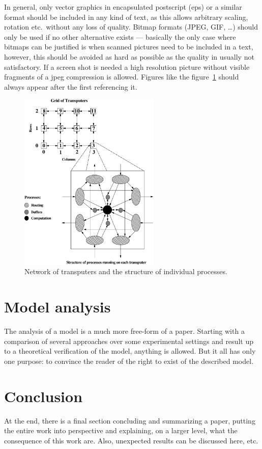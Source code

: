 \documentclass[12pt,twoside]{article}
\theoremstyle{plain}
\theoremstyle{definition}
\theoremstyle{remark}
\begin{document}
In general, only vector graphics in encapsulated postscript (eps) or a similar format should be included in any kind of text, as this allows arbitrary scaling, rotation etc.\ without any loss of quality. Bitmap formats (JPEG, GIF, \dots) should only be used if no other alternative exists
--- basically the only case where bitmaps can be justified is when scanned pictures need to be included in a text, however, this should be avoided as hard as possible as the quality in usually not satisfactory. If a screen shot is needed a high resolution picture without visible fragments of a jpeg compression is allowed. Figures like the figure~\ref{fig:samplefig} should always appear after the first referencing it.
\begin{figure}[hbtp]
	 \centerline{\includegraphics[width=0.6\textwidth]{samplefig.pdf}}
	 {\caption{Network of transputers and the structure of individual
processes.}\label{fig:samplefig}}
\end{figure}

\section{Model analysis}
\label{sec:analysis}
The analysis of a model is a much more free-form of a paper. Starting with a comparison of several approaches over some experimental settings and result up to a theoretical verification of the model, anything is allowed. But it all has only one purpose: to convince the reader of the right to exist of the described model.

\section{Conclusion}
\label{sec:concl}

At the end, there is a final section concluding and summarizing a
paper, putting the entire work into perspective and explaining, on a
larger level, what the consequence of this work are. Also, unexpected
results can be discussed here, etc.

%
%


\end{document}
